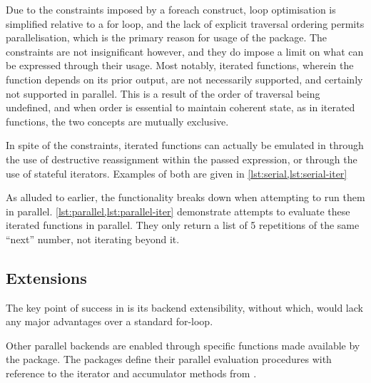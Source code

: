 Due to the constraints imposed by a foreach construct, loop optimisation
is simplified relative to a for loop, and the lack of explicit traversal
ordering permits parallelisation, which is the primary reason for usage
of the  package. The constraints are not insignificant
however, and they do impose a limit on what can be expressed through
their usage. Most notably, iterated functions, wherein the function
depends on its prior output, are not necessarily supported, and
certainly not supported in parallel. This is a result of the order of
traversal being undefined, and when order is essential to maintain
coherent state, as in iterated functions, the two concepts are mutually
exclusive.

In spite of the constraints, iterated functions can actually be emulated
in  through the use of destructive reassignment within the passed
expression, or through the use of stateful iterators. Examples of both
are given in \cref{lst:serial,lst:serial-iter}



As alluded to earlier, the functionality breaks down when attempting to
run them in parallel. \cref{lst:parallel,lst:parallel-iter}
demonstrate attempts to evaluate these iterated functions in parallel.
They only return a list of 5 repetitions of the same ``next'' number,
not iterating beyond it.



\subsection{Extensions}\label{subsec:foreach-extensions}

The key point of success in  is its backend extensibility,
without which,  would lack any major advantages over a standard
for-loop.

Other parallel backends are enabled through specific functions made
available by the  package. The packages define their parallel
evaluation procedures with reference to the iterator and accumulator
methods from .

